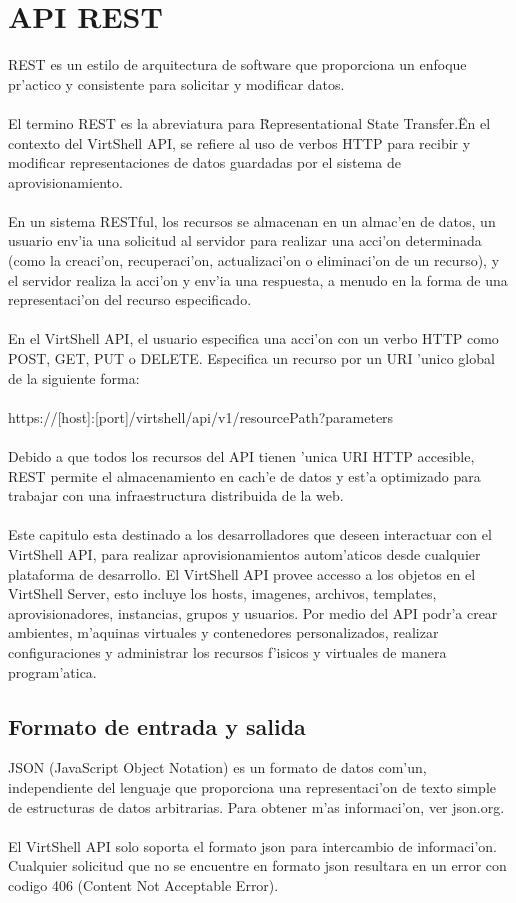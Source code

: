 \chapter{API REST}
\label{capapi}

REST es un estilo de arquitectura de software que proporciona un enfoque pr'actico y consistente para solicitar y modificar datos. \\
\\
El termino REST es la abreviatura para \"Representational State Transfer.\" En el contexto del VirtShell API, se refiere al uso de verbos HTTP para recibir y modificar representaciones de datos guardadas por el sistema de aprovisionamiento.\\
\\
En un sistema RESTful, los recursos se almacenan en un almac'en de datos, un usuario env'ia una solicitud al servidor para realizar una acci'on determinada (como la creaci'on, recuperaci'on, actualizaci'on o eliminaci'on de un recurso), y el servidor realiza la acci'on y env'ia una respuesta, a menudo en la forma de una representaci'on del recurso especificado.\\
\\
En el VirtShell API, el usuario especifica una acci'on con un verbo HTTP como POST, GET, PUT o DELETE. Especifica un recurso por un URI 'unico global de la siguiente forma: \\
\\
https://[host]:[port]/virtshell/api/v1/resourcePath?parameters\\
\\
Debido a que todos los recursos del API tienen 'unica URI HTTP accesible, REST permite el almacenamiento en cach'e de datos y est'a optimizado para trabajar con una infraestructura distribuida de la web.\\
\\
Este capitulo esta destinado a los desarrolladores que deseen interactuar con el VirtShell API, para realizar aprovisionamientos autom'aticos desde cualquier plataforma de desarrollo. El VirtShell API provee accesso a los objetos en el VirtShell Server, esto incluye los hosts, imagenes, archivos, templates, aprovisionadores, instancias, grupos y usuarios. Por medio del API podr'a crear ambientes, m'aquinas virtuales y contenedores personalizados, realizar configuraciones y administrar los recursos f'isicos y virtuales de manera program'atica. \\

\section{Formato de entrada y salida}
JSON (JavaScript Object Notation) es un formato de datos com'un, independiente del lenguaje que proporciona una representaci'on de texto simple de estructuras de datos arbitrarias. Para obtener m'as informaci'on, ver json.org.\\
\\
El VirtShell API solo soporta el formato json para intercambio de informaci'on. Cualquier solicitud que no se encuentre en formato json resultara en un error con codigo 406 (Content Not Acceptable Error).

